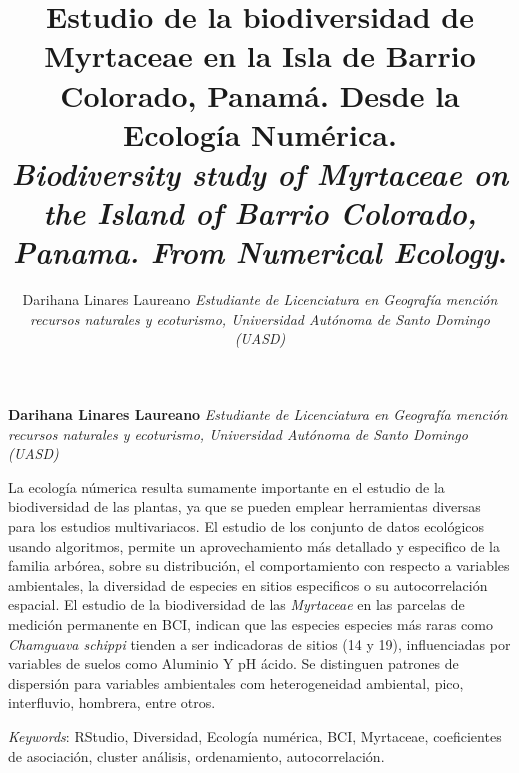 \documentclass[11pt,]{article}
\title{Estudio de la biodiversidad de Myrtaceae en la Isla de Barrio Colorado,
Panamá. Desde la Ecología Numérica.\\
\emph{Biodiversity study of Myrtaceae on the Island of Barrio Colorado,
Panama. From Numerical Ecology}.  }
\author{\Large Darihana Linares Laureano\vspace{0.05in} \newline\normalsize\emph{Estudiante de Licenciatura en Geografía mención recursos naturales y
ecoturismo, Universidad Autónoma de Santo Domingo (UASD)}  }
\date{}
\newcommand*{\authorfont}{\fontfamily{phv}\selectfont}
\renewenvironment{abstract}
 {{%
    \setlength{\leftmargin}{0mm}
    \setlength{\rightmargin}{\leftmargin}%
  }%
  \relax}
 {\endlist}
\begin{document}
	
%

{%
\setlength{\parindent}{0pt}
\thispagestyle{plain}
{\fontsize{18}{20}\selectfont\raggedright 
\maketitle  %

}

{
   \vskip 13.5pt\relax \normalsize\fontsize{11}{12} 
\textbf{\authorfont Darihana Linares Laureano} \hskip 15pt \emph{\small Estudiante de Licenciatura en Geografía mención recursos naturales y
ecoturismo, Universidad Autónoma de Santo Domingo (UASD)}   

}

}








\begin{abstract}

    \hbox{\vrule height .2pt width 39.14pc}

    \vskip 8.5pt %

\noindent La ecología númerica resulta sumamente importante en el estudio de la
biodiversidad de las plantas, ya que se pueden emplear herramientas
diversas para los estudios multivariacos. El estudio de los conjunto de
datos ecológicos usando algoritmos, permite un aprovechamiento más
detallado y especifico de la familia arbórea, sobre su distribución, el
comportamiento con respecto a variables ambientales, la diversidad de
especies en sitios especificos o su autocorrelación espacial. El estudio
de la biodiversidad de las \emph{Myrtaceae} en las parcelas de medición
permanente en BCI, indican que las especies especies más raras como
\emph{Chamguava schippi} tienden a ser indicadoras de sitios (14 y 19),
influenciadas por variables de suelos como Aluminio Y pH ácido. Se
distinguen patrones de dispersión para variables ambientales com
heterogeneidad ambiental, pico, interfluvio, hombrera, entre otros.


\vskip 8.5pt \noindent \emph{Keywords}: RStudio, Diversidad, Ecología numérica, BCI, Myrtaceae, coeficientes de
asociación, cluster análisis, ordenamiento, autocorrelación. \par

    \hbox{\vrule height .2pt width 39.14pc}



\end{abstract}
\end{document}
